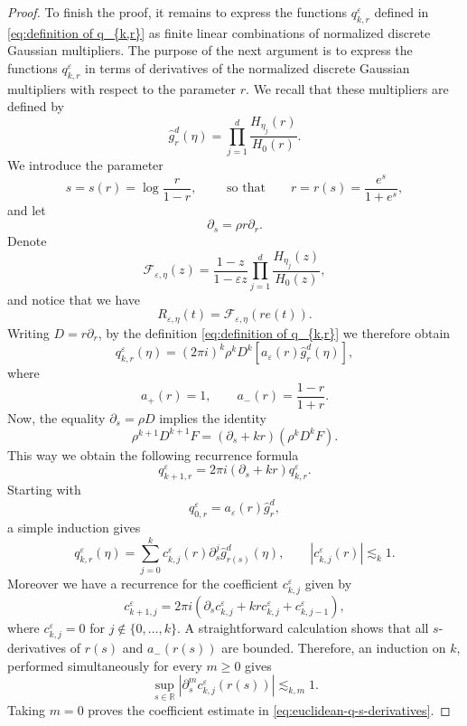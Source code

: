 \documentclass{article}
\newcommand{\R}{\mathbb R}
\theoremstyle{plain}
\numberwithin{equation}{section}
\begin{document}
\begin{proof}
To finish the proof, it remains to express the functions
\(q_{k,r}^{\varepsilon}\) defined in \eqref{eq:definition of q_{k,r}} as finite linear combinations of normalized
discrete Gaussian multipliers. The purpose of the next argument is to express the functions \(q_{k,r}^{\varepsilon}\) in terms of derivatives of the normalized discrete Gaussian multipliers with respect to the parameter $r$.  We recall that these multipliers are defined by
\[
 \widehat g_r^d(\eta)
 =
 \prod_{j=1}^d
 \frac{H_{\eta_j}(r)}{H_0(r)}.
\]
We introduce the parameter
\[
 s=s(r)=\log\frac r{1-r},\qquad \textrm{ so that}
 \qquad
 r=r(s)=\frac{e^s}{1+e^s},
\]
and let
\[
 \partial_s=\rho r\partial_r.
\]
Denote
\[
 \mathcal F_{\varepsilon,\eta}(z)
 =
 \frac{1-z}{1-\varepsilon z}
 \prod_{j=1}^d
 \frac{H_{\eta_j}(z)}{H_0(z)},
\]
and notice that we have
\[
 R_{\varepsilon,\eta}(t)
 =
 \mathcal F_{\varepsilon,\eta}(re(t)).
\]
Writing \(D=r\partial_r\), by the definition \eqref{eq:definition of q_{k,r}} we therefore obtain
\[
 q_{k,r}^{\varepsilon}(\eta)
 =
 (2\pi i)^k\rho^kD^k
 \left[
 a_\varepsilon(r)\widehat g_r^d(\eta)
 \right],
\]
where
\[
 a_+(r)=1,
 \qquad
 a_-(r)=\frac{1-r}{1+r}.
\]
Now, the equality \(\partial_s=\rho D\) implies the identity
\begin{equation*}
 \rho^{k+1}D^{k+1}F
 =
 (\partial_s+kr)(\rho^kD^kF).
\end{equation*}
This way we obtain the following recurrence formula
\[
 q_{k+1,r}^{\varepsilon}
 =
 2 \pi i(\partial_s+kr)q_{k,r}^{\varepsilon}.
\]
Starting with
\[
 q_{0,r}^{\varepsilon}
 =
 a_\varepsilon(r)\widehat g_r^d,
\]
a simple induction gives
\begin{equation}\label{eq:euclidean-q-s-derivatives}
 q_{k,r}^{\varepsilon}(\eta)
 =
 \sum_{j=0}^k
 c_{k,j}^{\varepsilon}(r)
 \partial_s^j
 \widehat g_{r(s)}^d(\eta),
 \qquad
 |c_{k,j}^{\varepsilon}(r)|\lesssim_k 1.
\end{equation}
Moreover we have a recurrence for the coefficient $c_{k,j}^\varepsilon$ given by
\[
 c_{k+1,j}^{\varepsilon}
 =2 \pi i\left(\partial_sc_{k,j}^{\varepsilon}
 +kr c_{k,j}^{\varepsilon}+c_{k,j-1}^{\varepsilon}\right),
\]
where $c_{k,j}^\varepsilon=0$ for $j \not \in \{0, \ldots, k\}$. A straightforward calculation shows that all \(s\)-derivatives of \(r(s)\) and \(a_-(r(s))\) are bounded. Therefore, an induction
on \(k\), performed simultaneously for every \(m\geq0\) gives
\[
 \sup_{s\in\R}
 |\partial_s^m c_{k,j}^{\varepsilon}(r(s))|\lesssim_{k,m} 1.
\]
Taking \(m=0\) proves the coefficient estimate in
\eqref{eq:euclidean-q-s-derivatives}.

\end{proof}
\end{document}
